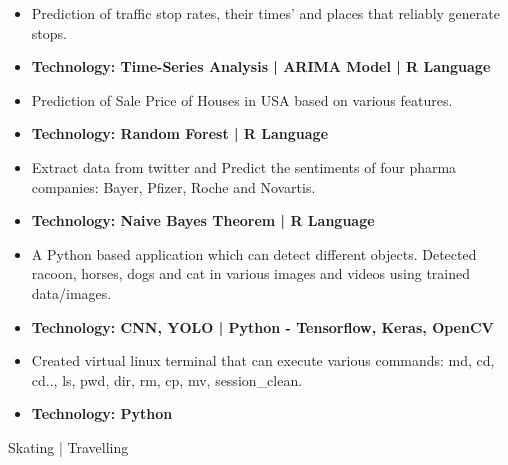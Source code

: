 \begin{itemize}
\item Prediction of traffic stop rates, their times’ and places that reliably generate stops.
\item\bf{Technology}{: Time-Series Analysis | ARIMA Model | R Language}
\end{itemize}
\smallskip
{}
\begin{itemize}
\item Prediction of Sale Price of Houses in USA based on various features.
\item\bf{Technology}{: Random Forest | R Language}
\end{itemize}
\smallskip
{}
\begin{itemize}
\item Extract data from twitter and Predict the sentiments of four pharma companies: Bayer, Pfizer, Roche and Novartis.
\item\bf{Technology}{: Naive Bayes Theorem | R Language}
\end{itemize}
\smallskip
{}
\begin{itemize}
\item A Python based application which can detect different objects. Detected racoon, horses, dogs and cat in various images and videos using trained data/images.
\item\bf{Technology}{: CNN, YOLO | Python - Tensorflow, Keras, OpenCV}
\end{itemize}
\smallskip
{}
\begin{itemize}
\item Created virtual linux terminal that can execute various commands: md, cd, cd.., ls, pwd, dir, rm, cp, mv, session\_clean.
\item\bf{Technology}{: Python}
\end{itemize}
\smallskip
{}
Skating | Travelling
